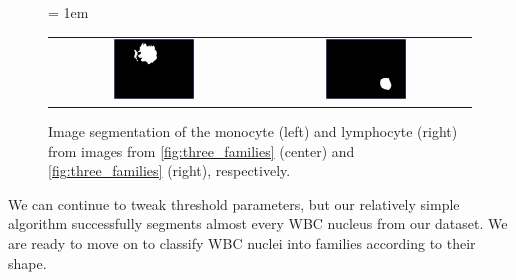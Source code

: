 \begin{figure}[h]
\centering
\tabcolsep = 1em
\mySfFamily
\begin{tabular}{c c}
\includegraphics[width = 0.4\textwidth]{../images/monocyte_binarized.png} & \includegraphics[width = 0.4\textwidth]{../images/lymphocyte_binarized.png}
\end{tabular}
\caption{Image segmentation of the monocyte (left) and lymphocyte (right) from images from \autoref{fig:three_families} (center) and \autoref{fig:three_families} (right), respectively.}
\label{fig:segmentation}
\end{figure}

We can continue to tweak threshold parameters, but our relatively simple algorithm successfully segments almost every WBC nucleus from our dataset. We are ready to move on to classify WBC nuclei into families according to their shape.\\

